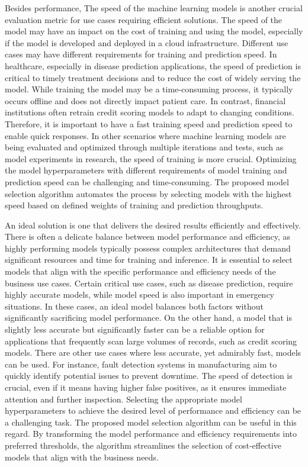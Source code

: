 Besides performance, The speed of the machine learning models is another crucial evaluation metric for use cases requiring efficient solutions. The speed of the model may have an impact on the cost of training and using the model, especially if the model is developed and deployed in a cloud infrastructure. Different use cases may have different requirements for training and prediction speed. In healthcare, especially in disease prediction applications, the speed of prediction is critical to timely treatment decisions and to reduce the cost of widely serving the model. While training the model may be a time-consuming process, it typically occurs offline and does not directly impact patient care. In contrast, financial institutions often retrain credit scoring models to adapt to changing conditions. Therefore, it is important to have a fast training speed and prediction speed to enable quick responses. In other scenarios where machine learning models are being evaluated and optimized through multiple iterations and tests, such as model experiments in research, the speed of training is more crucial. Optimizing the model hyperparameters with different requirements of model training and prediction speed can be challenging and time-consuming. The proposed model selection algorithm automates the process by selecting models with the highest speed based on defined weights of training and prediction throughputs.

An ideal solution is one that delivers the desired results efficiently and effectively. There is often a delicate balance between model performance and efficiency, as highly performing models typically possess complex architectures that demand significant resources and time for training and inference. It is essential to select models that align with the specific performance and efficiency needs of the business use cases. Certain critical use cases, such as disease prediction, require highly accurate models, while model speed is also important in emergency situations. In these cases, an ideal model balances both factors without significantly sacrificing model performance. On the other hand, a model that is slightly less accurate but significantly faster can be a reliable option for applications that frequently scan large volumes of records, such as credit scoring models. There are other use cases where less accurate, yet admirably fast, models can be used. For instance, fault detection systems in manufacturing aim to quickly identify potential issues to prevent downtime. The speed of detection is crucial, even if it means having higher false positives, as it ensures immediate attention and further inspection. Selecting the appropriate model hyperparameters to achieve the desired level of performance and efficiency can be a challenging task. The proposed model selection algorithm can be useful in this regard. By transforming the model performance and efficiency requirements into preferred thresholds, the algorithm streamlines the selection of cost-effective models that align with the business needs.

